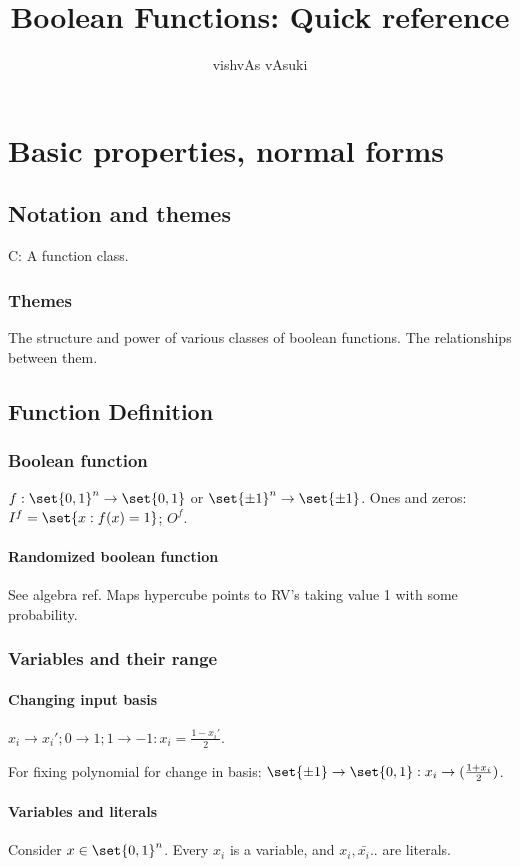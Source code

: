 \documentclass[oneside, article]{memoir}
\title{Boolean Functions: Quick reference}
\author{vishvAs vAsuki}
\begin{document}
\maketitle

\tableofcontents

\part{Basic properties, normal forms}
\chapter{Notation and themes}
C: A function class.

\section{Themes}
The structure and power of various classes of boolean functions. The relationships between them.


\chapter{Function Definition}
\section{Boolean function}
$f:\set{0,1}^{n} \to \set{0, 1}$ or $\set{\pm1}^{n} \to \set{\pm 1}$. Ones and zeros: $I^{f} = \set{x: f(x)=1}$; $O^{f}$.

\subsection{Randomized boolean function}
See algebra ref. Maps hypercube points to RV's taking value 1 with some probability.

\section{Variables and their range}
\subsection{Changing input basis}
$x_{i} \to x_{i}'; 0 \to 1; 1 \to -1 : x_{i} = \frac{1- x_{i}'}{2}$.

For fixing polynomial for change in basis: $\set{\pm 1} \to \set{0,1} :x_{i} \to (\frac{1+x_{i}}{2})$.

\subsection{Variables and literals}
Consider $x \in \set{0, 1}^{n}$. Every $x_i$ is a variable, and $x_i, \bar{x_i} .. $ are literals.
\end{document}
